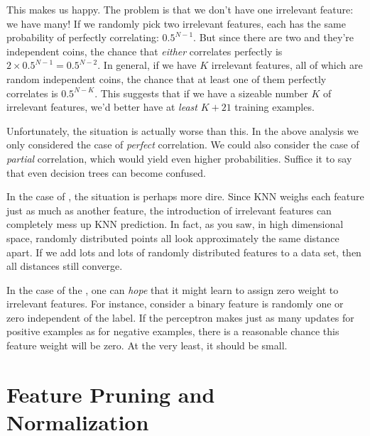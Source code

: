 This makes us happy.  The problem is that we don't have one irrelevant
feature: we have many! If we randomly pick
two irrelevant features, each has the same probability of
perfectly correlating: $0.5^{N-1}$.  But since there are two and
they're independent coins, the chance that \emph{either} correlates
perfectly is $2 \times 0.5^{N-1} = 0.5^{N-2}$.  In general, if we have
$K$ irrelevant features, all of which are random independent coins,
the chance that at least one of them perfectly correlates is
$0.5^{N-K}$.  This suggests that if we have a sizeable number $K$ of
irrelevant features, we'd better have at \emph{least} $K+21$ training
examples.

Unfortunately, the situation is actually worse than this.  In the
above analysis we only considered the case of \emph{perfect}
correlation.  We could also consider the case of \emph{partial}
correlation, which would yield even higher probabilities.
Suffice it to say that even
decision trees can become confused.


In the case of , the situation is
perhaps more dire.  Since KNN weighs each feature just as much as
another feature, the introduction of irrelevant features can
completely mess up KNN prediction.  In fact, as you saw, in high
dimensional space, randomly distributed points all look approximately
the same distance apart.  If we add lots and lots of randomly
distributed features to a data set, then all distances still
converge.

In the case of the , one can \emph{hope} that it
might learn to assign zero weight to irrelevant features.  For
instance, consider a binary feature is randomly one or zero
independent of the label.  If the perceptron makes just as many
updates for positive examples as for negative examples, there is a
reasonable chance this feature weight will be zero.  At the very
least, it should be small.



\section{Feature Pruning and Normalization}

